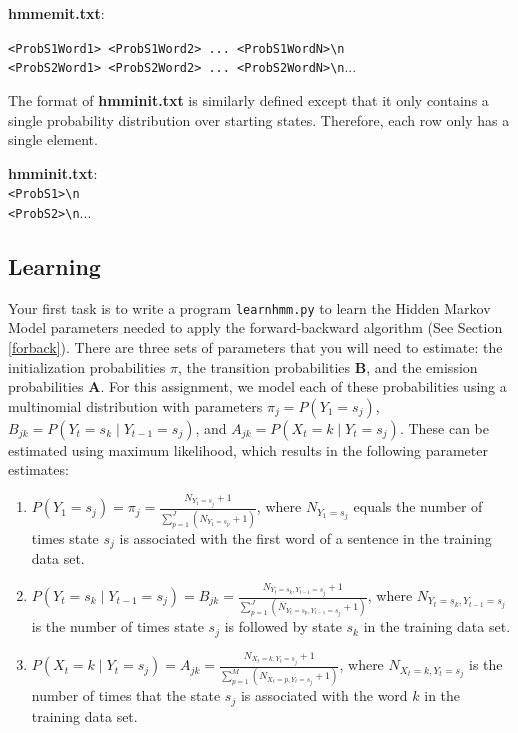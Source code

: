 \documentclass[11pt,addpoints,answers]{exam}
\begin{document}
\begin{enumerate}
\textbf{hmmemit.txt}:

\texttt{<ProbS1Word1> <ProbS1Word2> ... <ProbS1WordN>\textbackslash n}\\
\texttt{<ProbS2Word1> <ProbS2Word2> ... <ProbS2WordN>\textbackslash n}...
     
The format of \textbf{hmminit.txt} is similarly defined except that it only contains a single probability distribution over starting states. Therefore, each row only has a single element.

\textbf{hmminit.txt}:\\
\texttt{<ProbS1>\textbackslash n}\\
\texttt{<ProbS2>\textbackslash n}...

\end{enumerate}

\subsection{Learning}\label{learn}
Your first task is to write a program \texttt{learnhmm.py} to learn the Hidden Markov Model parameters needed to apply the forward-backward algorithm (See Section \ref{forback}). There are three sets of parameters that you will need to estimate: the initialization probabilities {\boldmath$\pi$}, the transition probabilities $\mathbf B$, and the emission probabilities $\mathbf A$. For this assignment, we model each of these probabilities using a multinomial distribution with parameters $ \pi_j=P(Y_1=s_j)$, $ B_{jk} = P(Y_{t}=s_k\mid Y_{t-1}=s_j)$, and $ A_{jk} = P(X_t=k\mid Y_{t}=s_j)$. These can be estimated using maximum likelihood, which results in the following parameter estimates:

\begin{enumerate}
    \item $P(Y_1 = s_j) = \pi_j = \frac{N_{Y_1=s_j}+1}{\sum_{p=1}^{J}(N_{Y_1=s_p}+1)}$, where $N_{Y_1=s_j}$ equals the number of times state $s_j$ is associated with the first word of a sentence in the training data set.
    \item $P(Y_{t} = s_k\mid Y_{t-1}=s_j) = B_{jk}= \frac{N_{Y_t=s_k,Y_{t-1}=s_j}+1}{\sum_{p=1}^J (N_{Y_t=s_p,Y_{t-1}=s_j}+1)}$, where $N_{Y_t=s_k,Y_{t-1}=s_j}$ is the number of times state $s_j$ is followed by state $s_k$ in the training data set.  
    \item $P(X_{t} = k\mid Y_{t}=s_j) = A_{jk}= \frac{N_{X_t=k,Y_t=s_j}+1}{\sum_{p=1}^M (N_{X_t=p,Y_t=s_j}+1)}$, where $N_{X_t=k,Y_t=s_j}$ is the number of times that the state $s_j$ is associated with the word $k$ in the training data set.
\end{enumerate}
\end{document}
